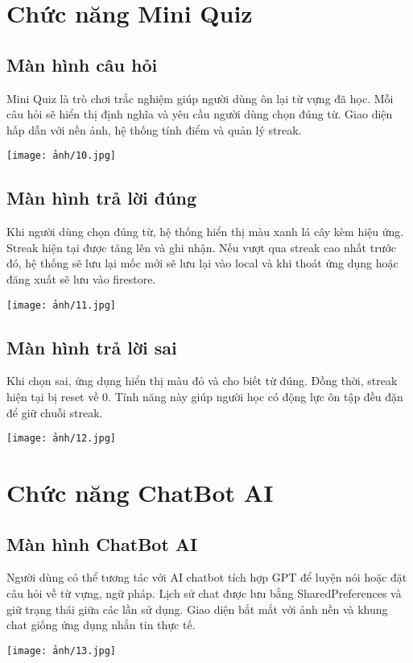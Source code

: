 \section{Chức năng Mini Quiz}
\subsection{Màn hình câu hỏi}
Mini Quiz là trò chơi trắc nghiệm giúp người dùng ôn lại từ vựng đã học. Mỗi câu hỏi sẽ hiển thị định nghĩa và yêu cầu người dùng chọn đúng từ. Giao diện hấp dẫn với nền ảnh, hệ thống tính điểm và quản lý streak.
\begin{center}
\texttt{[image: ảnh/10.jpg]}
\end{center}
\subsection{Màn hình trả lời đúng}
Khi người dùng chọn đúng từ, hệ thống hiển thị màu xanh lá cây kèm hiệu ứng. Streak hiện tại được tăng lên và ghi nhận. Nếu vượt qua streak cao nhất trước đó, hệ thống sẽ lưu lại mốc mới sẽ lưu lại vào local và khi thoát ứng dụng hoặc đăng xuất sẽ lưu vào firestore.
\begin{center}
\texttt{[image: ảnh/11.jpg]}
\end{center}
\subsection{Màn hình trả lời sai}
Khi chọn sai, ứng dụng hiển thị màu đỏ và cho biết từ đúng. Đồng thời, streak hiện tại bị reset về 0. Tính năng này giúp người học có động lực ôn tập đều đặn để giữ chuỗi streak.
\begin{center}
\texttt{[image: ảnh/12.jpg]}
\end{center}

\section{Chức năng ChatBot AI}
\subsection{Màn hình ChatBot AI}
Người dùng có thể tương tác với AI chatbot tích hợp GPT để luyện nói hoặc đặt câu hỏi về từ vựng, ngữ pháp. Lịch sử chat được lưu bằng SharedPreferences và giữ trạng thái giữa các lần sử dụng. Giao diện bắt mắt với ảnh nền và khung chat giống ứng dụng nhắn tin thực tế.
\begin{center}
\texttt{[image: ảnh/13.jpg]}
\end{center}

